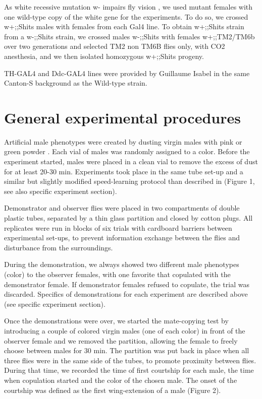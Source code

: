 \documentclass[a4paper, 12pt]{article}
\begin{document}
	As white recessive mutation w- impairs fly vision \parencite{gotz_optomotorische_1964}, we used mutant females with one wild-type copy of the white gene for the experiments. To do so, we crossed w+;;Shits males with females from each Gal4 line. To obtain w+;;Shits strain from a w-;;Shits strain, we crossed males w-;;Shits with females w+;;TM2/TM6b over two generations and selected TM2 non TM6B flies only, with CO2 anesthesia, and we then isolated homozygous w+;;Shits progeny.
	
	TH-GAL4 and Ddc-GAL4 lines were provided by Guillaume Isabel in the same Canton-S background as the Wild-type strain.
	
	\section{General experimental procedures}
	
	Artificial male phenotypes were created by dusting virgin males with pink or green powder \parencite{mery_public_2009}. Each vial of males was randomly assigned to a color. Before the experiment started, males were placed in a clean vial to remove the excess of dust for at least 20-30 min. Experiments took place in the same tube set-up and a similar but slightly modified speed-learning protocol than described in \textcite{dagaeff_drosophila_2016} (Figure 1, see also specific experiment section).
	
	Demonstrator and observer flies were placed in two compartments of double plastic tubes, separated by a thin glass partition and closed by cotton plugs. All replicates were run in blocks of six trials with cardboard barriers between experimental set-ups, to prevent information exchange between the flies and disturbance from the surroundings. 
	
	During the demonstration, we always showed two different male phenotypes (color) to the observer females, with one favorite that copulated with the demonstrator female. If demonstrator females refused to copulate, the trial was discarded. Specifics of demonstrations for each experiment are described above (see specific experiment section).
	
	Once the demonstrations were over, we started the mate-copying test by introducing a couple of colored virgin males (one of each color) in front of the observer female and we removed the partition, allowing the female to freely choose between males for 30 min. The partition was put back in place when all three flies were in the same side of the tubes, to promote proximity between flies. During that time, we recorded the time of first courtship for each male, the time when copulation started and the color of the chosen male. The onset of the courtship was defined as the first wing-extension of a male (Figure 2).
\end{document}
